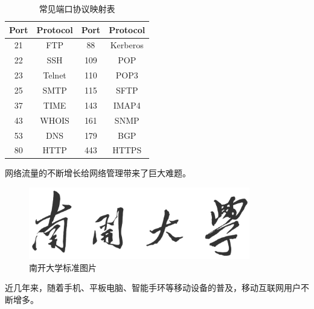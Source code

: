 \begin{table} [thb]
	\caption{常见端口协议映射表}\label{tab:21}
	\small
	\centering
	{
		\begin{tabular}{cccc}
			\toprule
			Port & Protocol & Port & Protocol\\
			\midrule
			21 & FTP & 88 & Kerberos\\
			22 & SSH & 109 & POP\\
			23 & Telnet & 110 & POP3\\
			25 & SMTP & 115 & SFTP\\
			37 & TIME & 143 & IMAP4\\
			43 & WHOIS & 161 & SNMP\\
			53 & DNS & 179 & BGP\\
			80 & HTTP & 443 & HTTPS\\
			
			\bottomrule
		\end{tabular}
	}
\end{table}

网络流量的不断增长给网络管理带来了巨大难题。

\begin{figure}[htb]
\centering
\includegraphics[width=3.8in]{./figures/0/nankaidaxue}
\caption{南开大学标准图片}
\label{fig:11}
\end{figure}

近几年来，随着手机、平板电脑、智能手环等移动设备的普及\supercite{bahl2000radar}，移动互联网用户不断增多\supercite{monkey}。